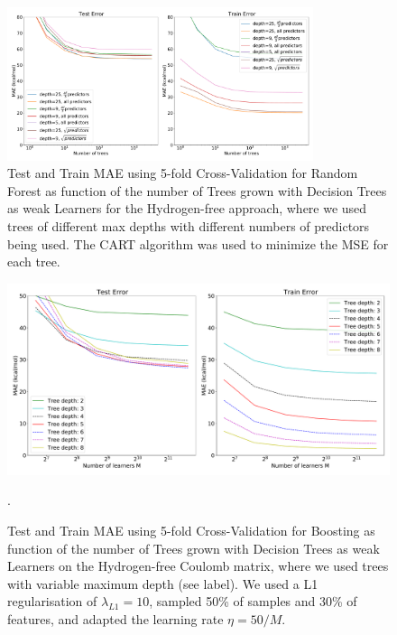 \documentclass[11pt,a4paper,notitlepage]{article}
\begin{document}
\begin{figure}[H]
\centering
\includegraphics[width=0.8\textwidth]{forestnoH.pdf}
\caption[Random Forests, no H]{Test and Train MAE using 5-fold Cross-Validation for Random Forest as function of the number of Trees grown with Decision Trees as weak Learners for the Hydrogen-free approach, where we used trees of different max depths with different numbers of predictors being used. The CART algorithm was used to minimize the MSE for each tree.} \label{fig:randomforestnoH}
\end{figure}

\begin{figure}[H]
\centering
\includegraphics[width=1\textwidth]{boosting1noH.pdf}
\caption[Boosting $M\eta=50$, no H]{Test and Train MAE using 5-fold Cross-Validation for Boosting as function of the number of Trees grown with Decision Trees as weak Learners on the Hydrogen-free Coulomb matrix, where we used trees with variable maximum depth (see label). We used a L1 regularisation of $\lambda_{L1}=10$, sampled 50\% of samples and 30\% of features, and adapted the learning rate $\eta=50/M$.} \label{fig:boosting3}.
\end{figure}



\end{document}
